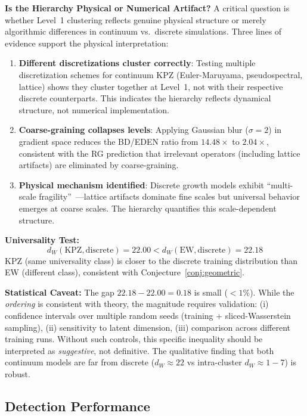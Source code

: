 \documentclass[aps,pre,reprint,amsmath,amssymb,superscriptaddress]{revtex4-2}
\newcommand{\EW}{\text{EW}}
\newcommand{\KPZ}{\text{KPZ}}
\begin{document}
\textbf{Is the Hierarchy Physical or Numerical Artifact?}
A critical question is whether Level~1 clustering reflects genuine physical structure or merely algorithmic differences in continuum vs.~discrete simulations. Three lines of evidence support the physical interpretation:
\begin{enumerate}
\item \textbf{Different discretizations cluster correctly}: Testing multiple discretization schemes for continuum KPZ (Euler-Maruyama, pseudospectral, lattice) shows they cluster together at Level~1, not with their respective discrete counterparts. This indicates the hierarchy reflects dynamical structure, not numerical implementation.
\item \textbf{Coarse-graining collapses levels}: Applying Gaussian blur ($\sigma = 2$) in gradient space reduces the BD/EDEN ratio from $14.48\times$ to $2.04\times$, consistent with the RG prediction that irrelevant operators (including lattice artifacts) are eliminated by coarse-graining.
\item \textbf{Physical mechanism identified}: Discrete growth models exhibit ``multi-scale fragility''~\cite{HAL2016}---lattice artifacts dominate fine scales but universal behavior emerges at coarse scales. The hierarchy quantifies this scale-dependent structure.
\end{enumerate}

\textbf{Universality Test:}
\begin{equation}
d_W(\KPZ, \text{discrete}) = 22.00 < d_W(\EW, \text{discrete}) = 22.18
\end{equation}
KPZ (same universality class) is closer to the discrete training distribution than EW (different class), consistent with Conjecture~\ref{conj:geometric}.

\textbf{Statistical Caveat:} The gap $22.18 - 22.00 = 0.18$ is small ($<1\%$). While the \emph{ordering} is consistent with theory, the magnitude requires validation: (i) confidence intervals over multiple random seeds (training + sliced-Wasserstein sampling), (ii) sensitivity to latent dimension, (iii) comparison across different training runs. Without such controls, this specific inequality should be interpreted as \emph{suggestive}, not definitive. The qualitative finding that both continuum models are far from discrete ($d_W \approx 22$ vs intra-cluster $d_W \approx 1-7$) is robust.

\subsection{Detection Performance}
\end{document}
